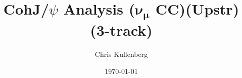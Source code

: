 \title{CohJ/$\psi$ Analysis ($\boldsymbol{\nu_\mu}$ \textbf{CC})(\textbf{Upstr})(\textbf{3-track})}
\author{Chris Kullenberg}
\date{\today}
